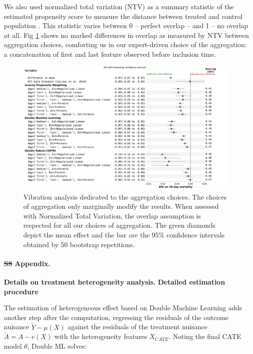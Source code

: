 \documentclass[10pt,letterpaper]{article}
\providecommand{\DIFaddtex}[1]{{\protect\color{blue}\uwave{#1}}} %
\providecommand{\DIFdeltex}[1]{{\protect\color{red}\sout{#1}}}                      %
\providecommand{\DIFaddbegin}{} %
\providecommand{\DIFaddend}{} %
\providecommand{\DIFdelbegin}{} %
\providecommand{\DIFdelend}{} %
\providecommand{\DIFadd}[1]{\texorpdfstring{\DIFaddtex{#1}}{#1}} %
\providecommand{\DIFdel}[1]{\texorpdfstring{\DIFdeltex{#1}}{}} %
\newcommand{\DIFscaledelfig}{0.5}
\newlength{\DIFdelgraphicswidth} %
\newlength{\DIFdelgraphicsheight} %
\newcommand{\DIFaddincludegraphics}[2][]{{\color{blue}\fbox{\DIFOincludegraphics[#1]{#2}}}} %
\newcommand{\DIFdelincludegraphics}[2][]{%
\sbox{\DIFdelgraphicsbox}{\DIFOincludegraphics[#1]{#2}}%
\settoboxwidth{\DIFdelgraphicswidth}{\DIFdelgraphicsbox} %
\settoboxtotalheight{\DIFdelgraphicsheight}{\DIFdelgraphicsbox} %
\scalebox{\DIFscaledelfig}{%
\parbox[b]{\DIFdelgraphicswidth}{\usebox{\DIFdelgraphicsbox}\\[-\baselineskip] \rule{\DIFdelgraphicswidth}{0em}}\llap{\resizebox{\DIFdelgraphicswidth}{\DIFdelgraphicsheight}{%
\setlength{\unitlength}{\DIFdelgraphicswidth}%
\begin{picture}(1,1)%
\thicklines\linethickness{2pt} %
{\color[rgb]{1,0,0}\put(0,0){\framebox(1,1){}}}%
{\color[rgb]{1,0,0}\put(0,0){\line( 1,1){1}}}%
{\color[rgb]{1,0,0}\put(0,1){\line(1,-1){1}}}%
\end{picture}%
}\hspace*{3pt}}} %
} %
\DeclareRobustCommand{\DIFaddbegin}{\DIFOaddbegin \let\includegraphics\DIFaddincludegraphics} %
\DeclareRobustCommand{\DIFaddend}{\DIFOaddend \let\includegraphics\DIFOincludegraphics} %
\DeclareRobustCommand{\DIFdelbegin}{\DIFOdelbegin \let\includegraphics\DIFdelincludegraphics} %
\DeclareRobustCommand{\DIFdelend}{\DIFOaddend \let\includegraphics\DIFOincludegraphics} %
\begin{document}
We also used normalized total variation (NTV) as a summary statistic of the
estimated propensity score to measure the distance between treated and control
population \cite{doutreligne2023select}. This statistic varies between 0 --
perfect overlap -- and 1 -- no overlap at all. Fig
\ref{apd:fig:albumin_for_sepsis:vibration_analysis_for_aggregation} shows no
marked differences in overlap as measured by NTV between aggregation choices,
comforting us in our expert-driven choice of the aggregation: a concatenation
of first and last feature observed before inclusion time.

\begin{figure}[h!]
  \centering
  \includegraphics[width=1.0\linewidth]{img_supp/sensitivity_feature_aggregation_albumin_for_sepsis__bs_50.pdf}
  \caption{Vibration analysis dedicated to the aggregation choices. The
    choices of aggregation only marginally modify the results. When assessed
    with Normalized Total Variation, the overlap assumption is respected for all
    our choices of aggregation. The green diamonds depict the mean effect and
    the bar are the 95\% confidence intervals obtained by 50 bootstrap
    repetitions.}\label{apd:fig:albumin_for_sepsis:vibration_analysis_for_aggregation}
\end{figure}
\clearpage


\paragraph*{\DIFdelbegin \DIFdel{S8 }\DIFdelend \DIFaddbegin \DIFadd{S7 }\DIFaddend Appendix.}
\label{apd:hte}
{\bf Details on treatment heterogeneity analysis.}
\textbf{Detailed estimation procedure}

The estimation of heterogeneous effect based on Double Machine Learning adds
another step after the computation, regressing the residuals of the outcome
nuisance $\tilde{Y} - \mu(X)$ against the residuals of the treatment nuisance
$\tilde{A} = A - e(X)$ with the heterogeneity features $X_{CATE}$. Noting the
final CATE model $\theta$, Double ML solves:
\end{document}
